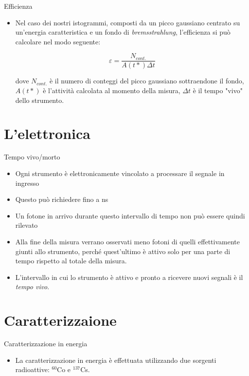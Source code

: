 \documentclass [xcolor=svgnames] {beamer}
\begin{document}
\begin{frame}{Efficienza}
	\begin{itemize}
		\item Nel caso dei nostri istogrammi, composti da un picco gaussiano centrato su un'energia caratteristica e un fondo di \emph{bremsstrahlung}, l'efficienza si può calcolare nel modo seguente:
		
		\begin{equation}
			\varepsilon = \dfrac{N_{cont.}}{A(t*) \Delta t}
		\end{equation}
	
		dove $N_{cont.}$ è il numero di conteggi del picco gaussiano sottraendone il fondo, $A(t*)$ è l'attività calcolata al momento della misura, $\Delta t$ è il tempo "vivo" dello strumento.
	\end{itemize}
\end{frame}

\section{L'elettronica}

\begin{frame}{Tempo vivo/morto}
	\begin{itemize}
		\item Ogni strumento è elettronicamente vincolato a processare il segnale in ingresso
		\item Questo può richiedere fino a ns
		\item Un fotone in arrivo durante questo intervallo di tempo non può essere quindi rilevato
		\item Alla fine della misura verrano osservati meno fotoni di quelli effettivamente giunti allo strumento, perché quest'ultimo è attivo solo per una parte di tempo rispetto al totale della misura.
		\item L'intervallo in cui lo strumento è attivo e pronto a ricevere nuovi segnali è il \emph{tempo vivo}.
	\end{itemize}
\end{frame}

\section{Caratterizzaione}
\begin{frame}{Caratterizzazione in energia}
	\begin{itemize}
		\item La caratterizzazione in energia è effettuata utilizzando due sorgenti radioattive: $^{60}$Co e $^{137}$Cs.
	\end{itemize}
\end{frame}
\end{document}
